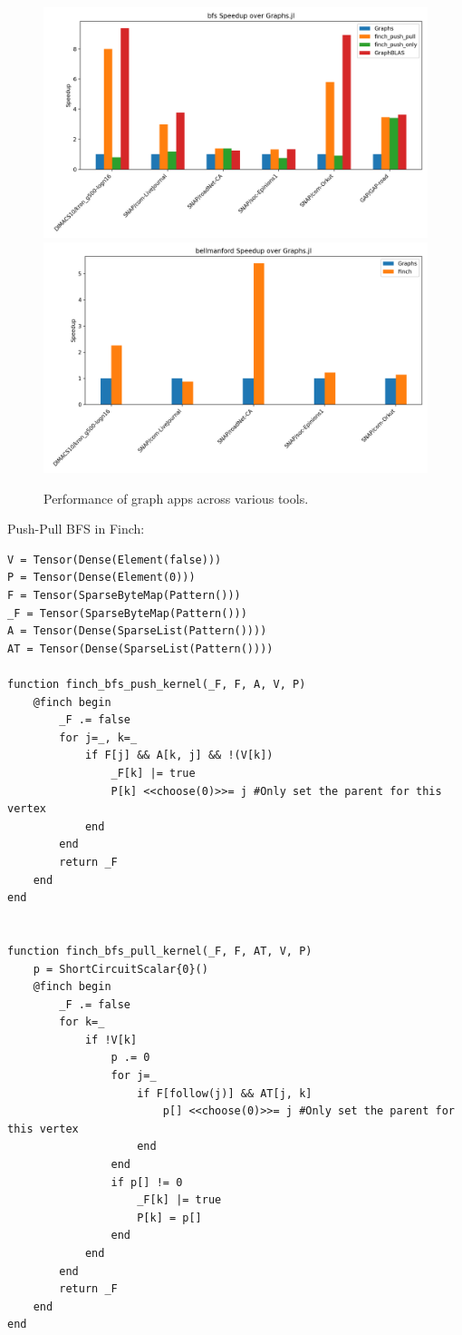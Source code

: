 \begin{figure}
	\includegraphics[width=\linewidth]{bfs_speedup_over_graphs.jl.png}
	\includegraphics[width=\linewidth]{bellmanford_speedup_over_graphs.jl.png}
    \caption{Performance of graph apps across various tools.}
     \label{graph_result}
\end{figure}

Push-Pull BFS in Finch:
\begin{verbatim}
V = Tensor(Dense(Element(false)))
P = Tensor(Dense(Element(0)))
F = Tensor(SparseByteMap(Pattern()))
_F = Tensor(SparseByteMap(Pattern()))
A = Tensor(Dense(SparseList(Pattern())))
AT = Tensor(Dense(SparseList(Pattern())))

function finch_bfs_push_kernel(_F, F, A, V, P)
    @finch begin
        _F .= false
        for j=_, k=_
            if F[j] && A[k, j] && !(V[k])
                _F[k] |= true
                P[k] <<choose(0)>>= j #Only set the parent for this vertex
            end
        end
        return _F
    end
end


function finch_bfs_pull_kernel(_F, F, AT, V, P)
    p = ShortCircuitScalar{0}()
    @finch begin
        _F .= false
        for k=_
            if !V[k]
                p .= 0
                for j=_
                    if F[follow(j)] && AT[j, k]
                        p[] <<choose(0)>>= j #Only set the parent for this vertex
                    end
                end
                if p[] != 0
                    _F[k] |= true
                    P[k] = p[]
                end
            end
        end
        return _F
    end
end
\end{verbatim}

